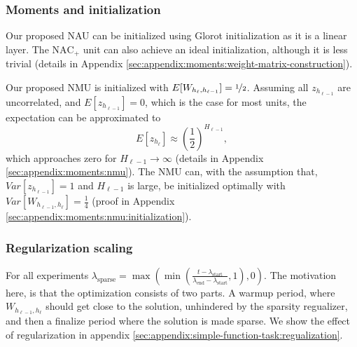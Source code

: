 \subsubsection{Moments and initialization}
Our proposed NAU can be initialized using Glorot initialization as it is a linear layer. The $\mathrm{NAC}_{+}$ unit can also achieve an ideal initialization, although it is less trivial (details in Appendix \ref{sec:appendix:moments:weight-matrix-construction}).

Our proposed NMU is initialized with $E[W_{h_{\ell}, h_{\ell - 1}}] = \nicefrac{1}{2}$. Assuming all $z_{h_{\ell-1}}$ are uncorrelated, and $E[z_{h_{\ell-1}}] = 0$, which is the case for most units, the expectation can be approximated to
\begin{equation}
E[z_{h_\ell}] \approx \left(\frac{1}{2}\right)^{H_{\ell-1}},
\end{equation}
which approaches zero for $H_{\ell-1} \rightarrow \infty$ (details in Appendix \ref{sec:appendix:moments:nmu}). The NMU can, with the assumption that, $Var[z_{h_{\ell-1}}] = 1$ and $H_{\ell-1}$ is large, be initialized optimally with $Var[W_{h_{\ell-1},h_\ell}] = \frac{1}{4}$ (proof in Appendix \ref{sec:appendix:moments:nmu:initialization}).

\subsubsection{Regularization scaling}

For all experiments $\lambda_{\mathrm{sparse}} = \max(\min(\frac{t - \lambda_{\mathrm{start}}}{\lambda_{\mathrm{end}} - \lambda_{\mathrm{start}}}, 1), 0)$. The motivation here, is that the optimization consists of two parts. A warmup period, where $W_{h_{\ell-1},h_\ell}$ should get close to the solution, unhindered by the sparsity regualizer, and then a finalize period where the solution is made sparse. We show the effect of regularization in appendix \ref{sec:appendix:simple-function-task:regualization}.
